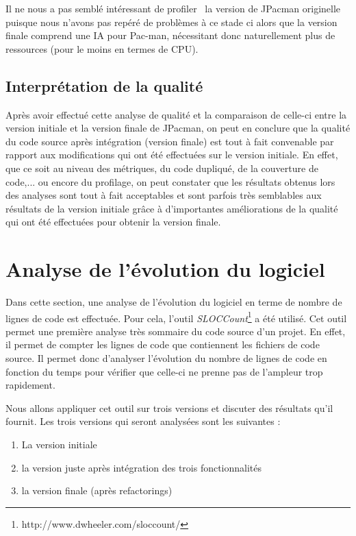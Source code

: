 \documentclass[12pt, openany]{report}
\begin{document}
Il ne nous a pas semblé intéressant de \og profiler \fg \, la version de JPacman originelle puisque nous n'avons pas repéré de problèmes à ce stade ci alors que la version finale comprend une IA pour Pac-man, nécessitant donc naturellement plus de ressources (pour le moins en termes de CPU).

\subsection{Interprétation de la qualité}

Après avoir effectué cette analyse de qualité et la comparaison de celle-ci entre la version initiale et la version finale de JPacman, on peut en conclure que la qualité du code source après intégration (version finale) est tout à fait convenable par rapport aux modifications qui ont été effectuées sur le version initiale. En effet, que ce soit au niveau des métriques, du code dupliqué, de la couverture de code,... ou encore du profilage, on peut constater que les résultats obtenus lors des analyses sont tout à fait acceptables et sont parfois très semblables aux résultats de la version initiale grâce à d'importantes améliorations de la qualité qui ont été effectuées pour obtenir la version finale.


\section{Analyse de l'évolution du logiciel}

Dans cette section, une analyse de l'évolution du logiciel en terme de nombre de lignes de code est effectuée. Pour cela, l'outil \textit{SLOCCount}\footnote{http://www.dwheeler.com/sloccount/} a été utilisé. Cet outil permet une première analyse très sommaire du code source d'un projet. En effet, il permet de compter les lignes de code que contiennent les fichiers de code source. Il permet donc d'analyser l'évolution du nombre de lignes de code en fonction du temps pour vérifier que celle-ci ne prenne pas de l'ampleur trop rapidement.

Nous allons appliquer cet outil sur trois versions et discuter des résultats qu'il fournit. Les trois versions qui seront analysées sont les suivantes : 

\begin{enumerate}
\item La version initiale
\item la version juste après intégration des trois fonctionnalités
\item la version finale (après refactorings)
\end{enumerate}
\end{document}
